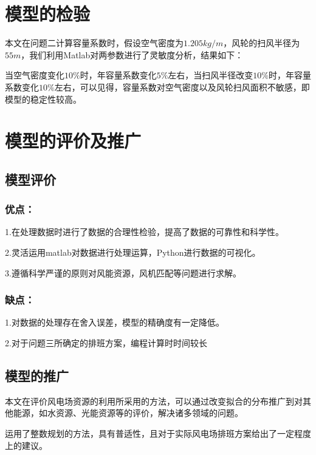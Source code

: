\documentclass[withoutpreface,bwprint]{cumcmthesis} %
\begin{document}
		
		
		
		\section{模型的检验}
		本文在问题二计算容量系数时，假设空气密度为$1.205kg/m$，风轮的扫风半径为$55m$，我们利用Matlab对两参数进行了灵敏度分析，结果如下：\par
		当空气密度变化$10\%$时，年容量系数变化$5\%$左右，当扫风半径改变$10\%$时，年容量系数变化$10\%$左右，可以见得，容量系数对空气密度以及风轮扫风面积不敏感，即模型的稳定性较高。
	
	
	
	
	
		\section{模型的评价及推广}
		\subsection{模型评价}
		\subsubsection{优点：}\par
		1.在处理数据时进行了数据的合理性检验，提高了数据的可靠性和科学性。\par
		2.灵活运用matlab对数据进行处理运算，Python进行数据的可视化。\par
		3.遵循科学严谨的原则对风能资源，风机匹配等问题进行求解。\par
		
		\subsubsection{缺点：}\par
		1.对数据的处理存在舍入误差，模型的精确度有一定降低。\par
		2.对于问题三所确定的排班方案，编程计算时时间较长
		
		
		\subsection{模型的推广}
		本文在评价风电场资源的利用所采用的方法，可以通过改变拟合的分布推广到对其他能源，如水资源、光能资源等的评价，解决诸多领域的问题。\par
		运用了整数规划的方法，具有普适性，且对于实际风电场排班方案给出了一定程度上的建议。
	
\end{document}
